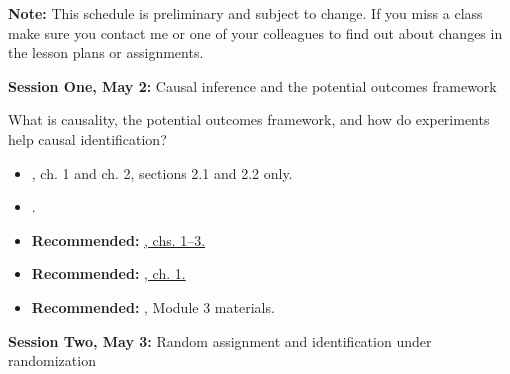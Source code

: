 \documentclass[10pt]{article}
\begin{document}
        \textbf{Note: } This schedule is preliminary and subject to change. If
        you miss a class make sure you contact me or one of your colleagues to
        find out about changes in the lesson plans or assignments.

\titleformat{\subsection}[hang]{\sffamily\bfseries}{\thesubsection}{}{}{}
\titleformat{\subsubsection}[hang]{\small\sffamily\bfseries}{\thesubsubsection}{}{}{}



\textbf{Session One, May 2:}  Causal inference and the potential outcomes framework

What is causality, the potential outcomes framework, and how do experiments help causal identification?

\begin{itemize}
    \item {}, ch. 1 and ch. 2, sections 2.1 and 2.2 only.
    \item \href{https://www-cambridge-org.eui.idm.oclc.org/core/journals/american-political-science-review/article/social-pressure-and-voter-turnout-evidence-from-a-largescale-field-experiment/11E84AF4C0B7FBD1D20C855972C2C3EB}{}.
    \item \textbf{Recommended:}  \href{https://www-jstor-org.eui.idm.oclc.org/stable/j.ctt4cgd52}{, chs. 1--3.}
    \item \textbf{Recommended:} \href{https://ebookcentral.proquest.com/lib/eui/detail.action?docID=688714}{, ch. 1.}
    \item \textbf{Recommended:}
        \href{https://egap.github.io/theory_and_practice_of_field_experiments/causal-inference.html}{},
        Module 3 materials.
\end{itemize}


\textbf{Session Two, May 3:} Random assignment and identification under randomization
\end{document}

